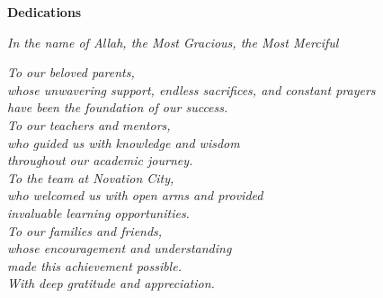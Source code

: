 
\thispagestyle{plain}
\begin{center}
{\huge\bfseries Dedications}
\end{center}

\vspace{1cm}

\begin{center}
\textit{In the name of Allah, the Most Gracious, the Most Merciful}
\end{center}

\vspace{2cm}

\begin{center}
\textit{To our beloved parents,}\\
\vspace{0.5cm}
\textit{whose unwavering support, endless sacrifices, and constant prayers}\\
\textit{have been the foundation of our success.}\\
\vspace{1cm}
\textit{To our teachers and mentors,}\\
\textit{who guided us with knowledge and wisdom}\\
\textit{throughout our academic journey.}\\
\vspace{1cm}
\textit{To the team at Novation City,}\\
\textit{who welcomed us with open arms and provided}\\
\textit{invaluable learning opportunities.}\\
\vspace{1cm}
\textit{To our families and friends,}\\
\textit{whose encouragement and understanding}\\
\textit{made this achievement possible.}\\
\vspace{2cm}
\textit{With deep gratitude and appreciation.}
\end{center}

\cleardoublepage